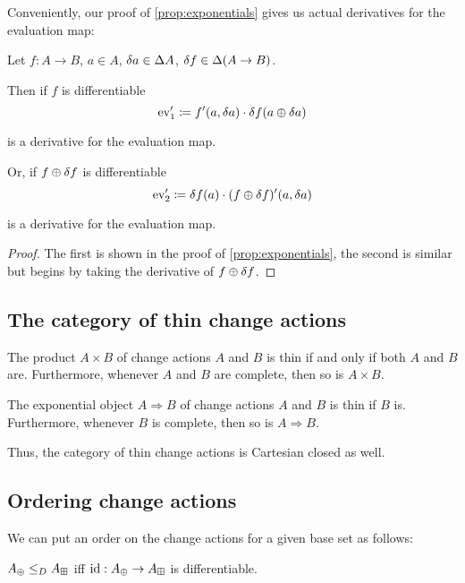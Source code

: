 Conveniently, our proof of \cref{prop:exponentials} gives us actual derivatives for the evaluation map:

\begin{prop}
\label{prop:evDerivatives}
  Let $f: A \rightarrow B$, $a \in A$, $\delta a \in
  \Delta A$, $\delta f \in \Delta (A \rightarrow B)$.

  Then if $f$ is differentiable
  $$\operatorname{ev}'_1 \coloneqq f'(a, \delta a) \cdot \delta f(a \oplus \delta a)$$

  is a derivative for the evaluation map.
  
  Or, if $f \oplus \delta f$ is differentiable
  $$\operatorname{ev}'_2 \coloneqq \delta f(a) \cdot (f \oplus \delta f)'(a, \delta a)$$

  is a derivative for the evaluation map.
\end{prop}
\begin{proof}
  The first is shown in the proof of \cref{prop:exponentials}, the second is
  similar but begins by taking the derivative of $f \oplus \delta f$.
\end{proof}

\subsection{The category of thin change actions}

\begin{prop}
  The product $A \times B$ of change actions $A$ and $B$ is thin if and only if both $A$ and $B$ are.
  Furthermore, whenever $A$ and $B$ are complete, then so is $A \times B$.

  The exponential object $A \Rightarrow B$ of change actions $A$ and $B$ is thin if $B$ is. 
  Furthermore, whenever $B$ is complete, then so is $A \Rightarrow B$.
\end{prop}

Thus, the category of thin change actions is Cartesian closed as well.

\subsection{Ordering change actions}

We can put an order on the change actions for a given base set as follows:

\begin{defn}
  $A_\oplus \leq_D A_\boxplus$ iff $\textrm{id}: A_\oplus \rightarrow A_\boxplus$ is differentiable.
\end{defn}

